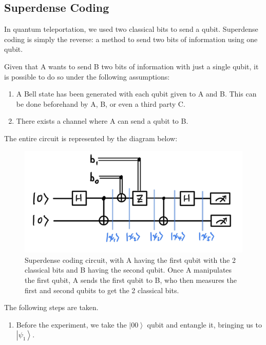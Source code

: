 \documentclass{article}
\newcommand{\ket}[1]{\ensuremath{\left|#1\right\rangle}}
\begin{document}
  \subsection{Superdense Coding} 

    In quantum teleportation, we used two classical bits to send a qubit. Superdense coding is simply the reverse: a method to send two bits of information using one qubit.  

    \begin{theorem} 
      Given that A wants to send B two bits of information with just a single qubit, it is possible to do so under the following assumptions: 
      \begin{enumerate} 
        \item A Bell state has been generated with each qubit given to A and B. This can be done beforehand by A, B, or even a third party C.
        \item There exists a channel where A can send a qubit to B.
      \end{enumerate}
      The entire circuit is represented by the diagram below: 
      \begin{figure}[H]
        \centering 
        \includegraphics[scale=0.4]{img/superdense_coding.png}
        \caption{Superdense coding circuit, with A having the first qubit with the 2 classical bits and B having the second qubit. Once A manipulates the first qubit, A sends the first qubit to B, who then measures the first and second qubits to get the 2 classical bits. } 
        \label{fig:superdense_coding}
      \end{figure}
      The following steps are taken. 
      \begin{enumerate} 
        \item Before the experiment, we take the $\ket{00}$ qubit and entangle it, bringing us to $\ket{\psi_1}$. 
          \begin{equation} 

\end{equation}
\end{enumerate}
\end{theorem}
\end{document}

